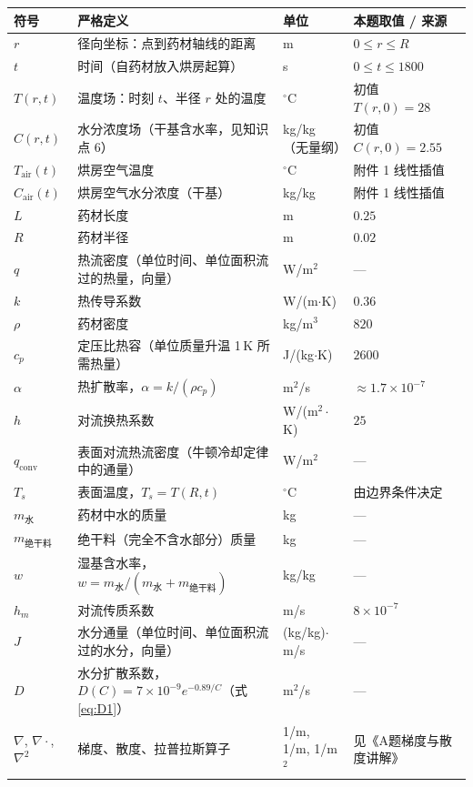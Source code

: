 \documentclass[12pt,a4paper]{ctexart}
\begin{document}
\begin{center}
\small
\begin{tabular}{llll}
\toprule
符号 & 严格定义 & 单位 & 本题取值 / 来源 \\
\midrule
$r$ & 径向坐标：点到药材轴线的距离 & m & $0\le r\le R$ \\
$t$ & 时间（自药材放入烘房起算） & s & $0\le t\le1800$ \\
$T(r,t)$ & 温度场：时刻 $t$、半径 $r$ 处的温度 & $^\circ$C & 初值 $T(r,0)=28$ \\
$C(r,t)$ & 水分浓度场（干基含水率，见知识点 6） & kg/kg（无量纲） & 初值 $C(r,0)=2.55$ \\
$T_{\mathrm{air}}(t)$ & 烘房空气温度 & $^\circ$C & 附件 1 线性插值 \\
$C_{\mathrm{air}}(t)$ & 烘房空气水分浓度（干基） & kg/kg & 附件 1 线性插值 \\
$L$ & 药材长度 & m & $0.25$ \\
$R$ & 药材半径 & m & $0.02$ \\
$q$ & 热流密度（单位时间、单位面积流过的热量，向量） & W/m$^2$ & --- \\
$k$ & 热传导系数 & W/(m$\cdot$K) & $0.36$ \\
$\rho$ & 药材密度 & kg/m$^3$ & $820$ \\
$c_p$ & 定压比热容（单位质量升温 1\,K 所需热量） & J/(kg$\cdot$K) & $2600$ \\
$\alpha$ & 热扩散率，$\alpha=k/(\rho c_p)$ & m$^2$/s & $\approx1.7\times10^{-7}$ \\
$h$ & 对流换热系数 & W/(m$^2\cdot$K) & $25$ \\
$q_{\mathrm{conv}}$ & 表面对流热流密度（牛顿冷却定律中的通量） & W/m$^2$ & --- \\
$T_s$ & 表面温度，$T_s=T(R,t)$ & $^\circ$C & 由边界条件决定 \\
$m_{\text{水}}$ & 药材中水的质量 & kg & --- \\
$m_{\text{绝干料}}$ & 绝干料（完全不含水部分）质量 & kg & --- \\
$w$ & 湿基含水率，$w=m_{\text{水}}/(m_{\text{水}}+m_{\text{绝干料}})$ & kg/kg & --- \\
$h_m$ & 对流传质系数 & m/s & $8\times10^{-7}$ \\
$J$ & 水分通量（单位时间、单位面积流过的水分，向量） & (kg/kg)$\cdot$m/s & --- \\
$D$ & 水分扩散系数，$D(C)=7\times10^{-9}e^{-0.89/C}$（式 \eqref{eq:D1}） & m$^2$/s & --- \\
$\nabla$, $\nabla\cdot$, $\nabla^2$ & 梯度、散度、拉普拉斯算子 & 1/m, 1/m, 1/m$^2$ & 见《A题梯度与散度讲解》 \\

\end{tabular}
\end{center}
\end{document}
